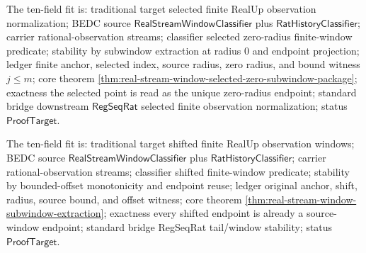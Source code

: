 The ten-field fit is: traditional target selected finite RealUp observation
normalization; BEDC source $\mathsf{RealStreamWindowClassifier}$ plus
$\mathsf{RatHistoryClassifier}$; carrier rational-observation streams;
classifier selected zero-radius finite-window predicate; stability by
subwindow extraction at radius $0$ and endpoint projection; ledger finite
anchor, selected index, source radius, zero radius, and bound witness
$j\le m$; core theorem
\autoref{thm:real-stream-window-selected-zero-subwindow-package}; exactness the
selected point is read as the unique zero-radius endpoint; standard bridge
downstream $\mathsf{RegSeqRat}$ selected finite observation normalization;
status $\mathsf{ProofTarget}$.

The ten-field fit is: traditional target shifted finite RealUp observation
windows; BEDC source $\mathsf{RealStreamWindowClassifier}$ plus
$\mathsf{RatHistoryClassifier}$; carrier rational-observation streams;
classifier shifted finite-window predicate; stability by bounded-offset
monotonicity and endpoint reuse; ledger original anchor, shift, radius, source
bound, and offset witness; core theorem
\autoref{thm:real-stream-window-subwindow-extraction}; exactness every shifted
endpoint is already a source-window endpoint; standard bridge RegSeqRat
tail/window stability; status $\mathsf{ProofTarget}$.
